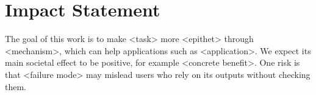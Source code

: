 \documentclass{article}
\begin{document}
\section*{Impact Statement}
The goal of this work is to make <task> more <epithet> through <mechanism>, which can help applications such as <application>.
We expect its main societal effect to be positive, for example <concrete benefit>.
One risk is that <failure mode> may mislead users who rely on its outputs without checking them.





\end{document}
